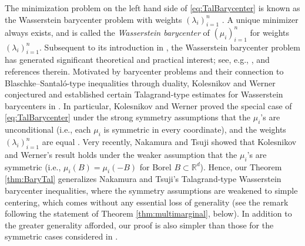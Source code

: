 \documentclass[10pt]{article}
\newcommand{\R}{\mathbb{R}}
\begin{document}
The minimization problem on the left hand side of \eqref{eq:TalBarycenter} is known as the Wasserstein barycenter problem with weights $(\lambda_i)_{i=1}^n$ \cite{AC}.  A unique minimizer always exists, and is called the \emph{Wasserstein barycenter} of $(\mu_i)_{i=1}^n$ for  weights $(\lambda_i)_{i=1}^n$.  Subsequent to its introduction in \cite{AC}, the Wasserstein barycenter problem has generated    significant theoretical and practical interest; see, e.g., \cite[Ch. 9]{PC}, and references therein.  Motivated by barycenter problems and their connection to Blaschke--Santal\'o-type inequalities through duality, Kolesnikov and Werner  conjectured and established certain Talagrand-type estimates for Wasserstein barycenters in \cite{KW}.  In particular, Kolesnikov and Werner proved the special case of \eqref{eq:TalBarycenter} under the strong symmetry assumptions that the $\mu_i$'s are unconditional (i.e., each $\mu_i$ is symmetric in every coordinate), and the weights $(\lambda_i)_{i=1}^n$ are equal \cite[Theorem 7.1]{KW}.  Very recently, Nakamura and Tsuji showed that Kolesnikov and Werner's result holds under the weaker assumption that the $\mu_i$'s are symmetric \cite[Theorem 4.5]{NT} (i.e., $\mu_i(B) = \mu_i(-B)$ for Borel $B\subset \R^d$).  Hence, our Theorem \ref{thm:BaryTal}  generalizes Nakamura and Tsuji's Talagrand-type Wasserstein  barycenter inequalities, where the symmetry assumptions are weakened to simple centering, which comes without any essential loss of generality (see the remark following the statement of Theorem \ref{thm:multimarginal}, below).  In addition to the greater generality afforded, our proof  is also   simpler than those  for the symmetric cases considered in \cite{KW,NT}.  
\end{document}
